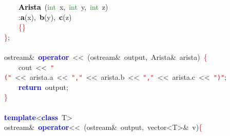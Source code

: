 \mbox{}\ \ \ \ \textbf{\textcolor{Black}{Arista}}\ \textcolor{BrickRed}{(}\textcolor{ForestGreen}{int}\ x\textcolor{BrickRed}{,}\ \textcolor{ForestGreen}{int}\ y\textcolor{BrickRed}{,}\ \textcolor{ForestGreen}{int}\ z\textcolor{BrickRed}{)} \\
\mbox{}\ \ \ \ \textcolor{BrickRed}{:}\textbf{\textcolor{Black}{a}}\textcolor{BrickRed}{(}x\textcolor{BrickRed}{),}\ \textbf{\textcolor{Black}{b}}\textcolor{BrickRed}{(}y\textcolor{BrickRed}{),}\ \textbf{\textcolor{Black}{c}}\textcolor{BrickRed}{(}z\textcolor{BrickRed}{)} \\
\mbox{}\ \ \ \ \textcolor{Red}{\{\}} \\
\mbox{}\textcolor{Red}{\}}\textcolor{BrickRed}{;} \\
\mbox{} \\
\mbox{}ostream\textcolor{BrickRed}{\&}\ \textbf{\textcolor{Blue}{operator}}\ \textcolor{BrickRed}{\textless{}\textless{}}\ \textcolor{BrickRed}{(}ostream\textcolor{BrickRed}{\&}\ output\textcolor{BrickRed}{,}\ Arista\textcolor{BrickRed}{\&}\ arista\textcolor{BrickRed}{)}\ \textcolor{Red}{\{} \\
\mbox{}\ \ \ \ cout\ \textcolor{BrickRed}{\textless{}\textless{}}\ \texttt{\textcolor{Red}{"{}("{}}}\ \textcolor{BrickRed}{\textless{}\textless{}}\ arista\textcolor{BrickRed}{.}a\ \textcolor{BrickRed}{\textless{}\textless{}}\ \texttt{\textcolor{Red}{"{},"{}}}\ \textcolor{BrickRed}{\textless{}\textless{}}\ arista\textcolor{BrickRed}{.}b\ \textcolor{BrickRed}{\textless{}\textless{}}\ \texttt{\textcolor{Red}{"{},"{}}}\ \textcolor{BrickRed}{\textless{}\textless{}}\ arista\textcolor{BrickRed}{.}c\ \textcolor{BrickRed}{\textless{}\textless{}}\ \texttt{\textcolor{Red}{"{})"{}}}\textcolor{BrickRed}{;} \\
\mbox{}\ \ \ \ \textbf{\textcolor{Blue}{return}}\ output\textcolor{BrickRed}{;} \\
\mbox{}\textcolor{Red}{\}} \\
\mbox{} \\
\mbox{}\textbf{\textcolor{Blue}{template}}\textcolor{BrickRed}{\textless{}}\textbf{\textcolor{Blue}{class}}\ \textcolor{TealBlue}{T}\textcolor{BrickRed}{\textgreater{}} \\
\mbox{}ostream\textcolor{BrickRed}{\&}\ \textbf{\textcolor{Blue}{operator}}\textcolor{BrickRed}{\textless{}\textless{}}\ \textcolor{BrickRed}{(}ostream\textcolor{BrickRed}{\&}\ output\textcolor{BrickRed}{,}\ vector\textcolor{BrickRed}{\textless{}}T\textcolor{BrickRed}{\textgreater{}\&}\ v\textcolor{BrickRed}{)}\textcolor{Red}{\{} \\
